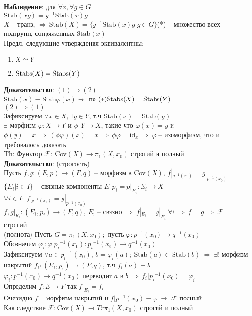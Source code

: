	\textbf{Наблюдение}: для $\forall x, \forall g \in G$\\
	$\text{Stab}(xg) = g^{-1}\text{Stab}(x)g$\\
	$X$ -- транз, $\Rightarrow\ \text{Stab}(X) = \{g^{-1}\text{Stab}(x)g|g \in G\}$(*) -- множество всех подгрупп, сопряженных $\text{Stab}(x)$\\
	Предл. следующие утверждения эквивалентны:\\
	\begin{enumerate}
		\item $X \simeq Y$
		\item $\text{\text{Stabs}}(X) = \text{\text{Stabs}}(Y)$
	\end{enumerate}
	\textbf{Доказательство}: $(1) \Rightarrow (2)$\\
	$\text{Stab}(x) = \text{Stab}\varphi(x) \Rightarrow$ по $(*) \text{\text{Stabs}}(X) = \text{\text{Stabs}}(Y)$\\
	$(2) \Rightarrow (1)$\\
	Зафиксируем $\forall x \in X, \exists y \in Y$, т.ч $\text{Stab}(x) = \text{Stab}(y)$\\
	$\exists$ морфизм $\varphi: X \rightarrow Y$ и $\phi: Y \rightarrow X$, такие что $\varphi(x) = y$ и $\phi(y) = x\ \Rightarrow\ (\phi \varphi)(x) = x\ \Rightarrow\ \phi \varphi =  \text{id}_x\ \Rightarrow\ \varphi$ -- изоморфизм, что и требовалось доказать\\
	Th: Функтор $\mathcal{F}: \ \text{Cov}(X)\rightarrow {\pi}_1 (X, x_0)$ строгий и полный\\
	\textbf{Доказательство}: (строгость)\\
	Пусть $f, g: (E,p) \rightarrow (F,q)$ -- морфизм в $\text{Cov}(X)$, $f|_{p^{-1}(x_0)} = g|_{p^{-1}(x_0)}$\\
	$\{E_{i}|i \in I\}$ -- связные компоненты $E, p_i = p|_{E_i}: E_i \rightarrow X$\\
	$\forall i \in I: \ f|_{p^{-1}(x_0)} = g|_{p^{-1}(x_0)}$\\
	$f,g|_{E_i}: (E_i,p_i) \rightarrow (F,q)$, $E_i$ -- связно $\Rightarrow\ f|_{E_i} = g|_{E_i}\ \forall i\ \Rightarrow\ f = g\ \Rightarrow\ \mathcal{F}$ строгий\\
	(полнота) Пусть $G = {\pi}_1 (X, x_0);$ пусть $\varphi: p^{-1}(x_0) \rightarrow q^{-1}(x_0)$\\
	Обозначим $\varphi_i: \varphi|{p_i}^{-1}(x_0): {p_i}^{-1}(x_0) \rightarrow q^{-1}(x_0)$\\
	Зафиксируем $\forall a \in {p_i}^{-1}(x_0),\ b = \varphi_i(a);\ \text{Stab}(a) \subset \text{Stab}(b)\ \Rightarrow\ \exists!$ морфизм накрытий $f_i: (E_i,p_i) \rightarrow (F,q)$, т.ч $f_i(a) = b$\\
	$\varphi_i: p^{-1}(x_0) \rightarrow q^{-1}(x_0)$ переводит $a$ в $b\ \Rightarrow\ f_i|{p_i}^{-1}(x_0) = \varphi_i$\\
	Определим $f: E \rightarrow F$ так $f|_{E_i} = f_i$\\
	Очевидно $f$ -- морфизм накрытий и $f|{p}^{-1}(x_0) = \varphi\ \Rightarrow\ \mathcal{F}$ полный\\
	Как следствие $\mathcal{F}: \text{Cov}(X) \rightarrow Tr{\pi}_1 (X, x_0)$ строгий и полный\\


